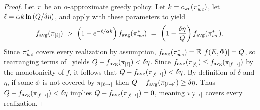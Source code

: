 %
\begin{proof}
%
Let $\pi$ be an $\alpha$-approximate greedy policy.
Let $k = {c_{\text{wc}}{(\pi_{wc}^*)}}$, let $\ell = \alpha k \ln  \left( {Q/
  \delta \eta} \right) $, and apply  with
 these parameters to yield
 \begin{equation}
   \label{eq:wc1costs}
f_{\text{avg}}( \pi_{[{\ell}]} ) \ > \  \left( {1 - e^{-\ell/\alpha k}} \right) 
f_{\text{avg}}(\pi_{wc}^*) \ = \   \left( {1 - \frac{\delta \eta}{Q}} \right) f_{\text{avg}}(\pi_{wc}^*)
\mbox{.}   
 \end{equation}
 Since $\pi_{wc}^*$ covers every realization by assumption, $f_{\text{avg}}(\pi_{wc}^*) =
 \mathbb{E}\left[f(E, {\color{black}{\ensuremath{\Phi}}})\right] = Q$, so rearranging terms
 of~ yields $Q - f_{\text{avg}}( \pi_{[{\ell}]} ) < \delta \eta$.
 Since $f_{\text{avg}}( \pi_{[{\ell}]} ) \le
 f_{\text{avg}}( \pi_{[{\ell}\to]})$ by the \term monotonicity of $f$, 
it
 follows that $Q - f_{\text{avg}}( \pi_{[{\ell}\to]}) < \delta \eta$.
%
By definition of $\delta$ and $\eta$, if some ${\color{black}{\ensuremath{\phi}}}$ is
not covered by $ \pi_{[{\ell}\to]}$ then 
$Q - f_{\text{avg}}( \pi_{[{\ell}\to]}) \ge \delta \eta$.
%
%
%
%
Thus $Q - f_{\text{avg}}( \pi_{[{\ell}\to]}) < \delta \eta$ implies $Q -
 f_{\text{avg}}( \pi_{[{\ell}\to]}) = 0$, meaning $ \pi_{[{\ell}\to]}$ covers
 every realization. %


\end{proof}
